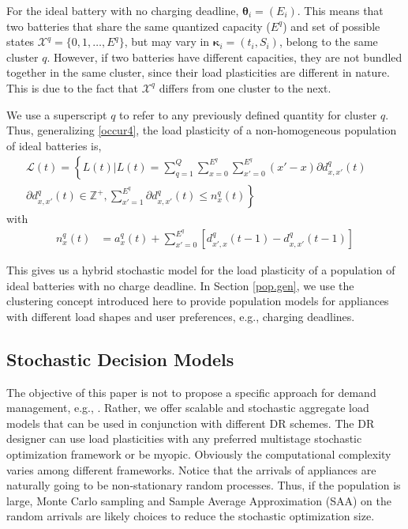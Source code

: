 \documentclass[10pt]{IEEEtran}
\begin{document}
For the ideal battery with no charging deadline, $\boldsymbol{\theta}_i = (E_i)$. This means that two batteries that share the same quantized capacity ($E^q$) and set of possible states ${\mathcal X}^q=\{0,1,\ldots,E^q\}$, but may vary in $\boldsymbol{\kappa}_i = (t_i,S_i)$,  belong to the same cluster $q$.  However, if two batteries have different capacities, they are not bundled together in the same cluster, since their load plasticities are different in nature. This is due to the fact that ${\mathcal X}^q$ differs from one cluster to the next.

We use a superscript $q$ to refer to any previously defined quantity for cluster $q$. Thus, generalizing \eqref{occur4}, the load plasticity of a non-homogeneous population of ideal batteries is,
  \begin{eqnarray} \label{occur5} \nonumber
{\mathcal L}(t) = \left\{L(t) |  L(t) = \sum_{q=1}^Q\sum_{x=0}^{E^q} \sum_{x'=0}^{E^q} (x'-x)\partial d^q_{x,x'}(t)\right.\nonumber 
& & \\ \left. \partial d_{x,x'}^q(t) \in \mathbb{Z}^+, \sum_{x' = 1}^{E^q}\partial d_{x,x'}^q(t)\leq n^q_x(t) \right\}& &  \nonumber
\end{eqnarray}
with
\begin{align}
n_{x}^q(t)&=  a^q_x(t) + \sum_{x' = 0}^{E^q} [d^q_{x',x}(t-1)- d^q_{x,x'}(t-1)]
\end{align}

This gives us a hybrid stochastic model for the load plasticity of a population of ideal batteries with no charge deadline. In Section \ref{pop.gen}, we use the clustering concept introduced here to provide population models for appliances with different load shapes and user preferences, e.g., charging deadlines.

\vspace{-0.4cm}

\subsection{Stochastic Decision Models}
The objective of this paper is not to propose a specific approach for demand management, e.g., \cite{mohsenian2010autonomous,kefayati2010efficient,kesidis,chen2012large,subramanian2012real,ramraja,6471273}. Rather, we offer scalable and  stochastic aggregate load models that can be used in conjunction with different DR schemes. The DR designer can use load plasticities with any preferred multistage stochastic optimization framework or be myopic. Obviously the computational complexity varies among different frameworks. Notice that the arrivals of appliances are naturally going to be non-stationary random processes. Thus, if the population is large, Monte Carlo sampling and Sample Average Approximation (SAA) on the random arrivals \cite{kleywegt2002sample} are  likely choices to reduce the stochastic optimization size.
\end{document}
